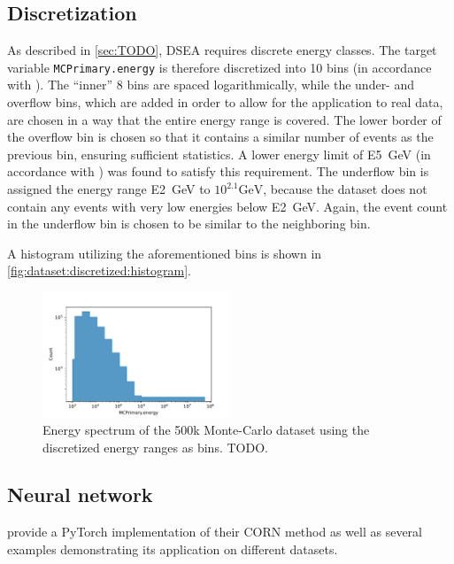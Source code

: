\subsection{Discretization}
As described in \autoref{sec:TODO}, DSEA requires discrete energy classes.
The target variable \texttt{MCPrimary.energy} is therefore discretized into \num{10} bins
(in accordance with \cite{dsea_samuel}).
%
The \enquote{inner} \num{8} bins are spaced logarithmically,
  while the under- and overflow bins,
    which are added in order to allow for the application to real data,
  are chosen in a way that the entire energy range is covered.
%
The lower border of the overflow bin is chosen so that it contains a similar number of events as the previous bin,
ensuring sufficient statistics.
A lower energy limit of \SI{E5}{\giga\electronvolt} (in accordance with \cite{dsea_samuel}) was found to satisfy this requirement.
%
The underflow bin is assigned the energy range \SI{E2}{\giga\electronvolt} to $10^{2.1} \si{\giga\electronvolt}$,
because the dataset does not contain any events with very low energies below \SI{E2}{\giga\electronvolt}.
Again, the event count in the underflow bin is chosen to be similar to the neighboring bin.

A histogram utilizing the aforementioned bins is shown in \autoref{fig:dataset:discretized:histogram}.

\begin{figure}
  \centering
  \includegraphics[width=0.5\textwidth]{content/plots/dataset:discretized:histogram.pdf}
  \caption{Energy spectrum of the 500k Monte-Carlo dataset using the discretized energy ranges as bins. TODO.}
  \label{fig:dataset:discretized:histogram}
\end{figure}


\subsection{Neural network}
\citeauthor{corn} provide a PyTorch \cite{pytorch} implementation of their \textsc{CORN} method
as well as several examples demonstrating its application on different datasets.

